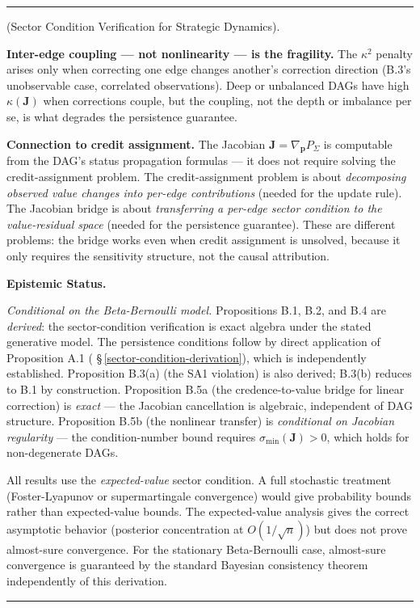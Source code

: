 \documentclass[11pt,oneside]{article}
\newcounter{claim}[section]
\renewcommand{\theclaim}{\thesection.\arabic{claim}}
\newenvironment{segment}[2]{%
  \refstepcounter{claim}%
  \bigskip\noindent\hrule\smallskip
  \noindent{\bfseries #1~\theclaim}\enskip(#2).\par\smallskip
  \noindent\ignorespaces
}{%
  \par\smallskip\noindent\hrule\bigskip
}
\newenvironment{derivation}[1][]{\begin{segment}{Derivation}{#1}}{\end{segment}}
\begin{document}
\begin{derivation}[Sector Condition Verification for Strategic Dynamics]
\textbf{Inter-edge coupling — not nonlinearity — is the fragility.} The $\kappa^2$ penalty arises only when correcting one edge changes another's correction direction (B.3's unobservable case, correlated observations). Deep or unbalanced DAGs have high $\kappa(\mathbf{J})$ when corrections couple, but the coupling, not the depth or imbalance per se, is what degrades the persistence guarantee.

\textbf{Connection to credit assignment.} The Jacobian $\mathbf{J} = \nabla_\mathbf{p} P_\Sigma$ is computable from the DAG's status propagation formulas — it does not require solving the credit-assignment problem. The credit-assignment problem is about \textit{decomposing observed value changes into per-edge contributions} (needed for the update rule). The Jacobian bridge is about \textit{transferring a per-edge sector condition to the value-residual space} (needed for the persistence guarantee). These are different problems: the bridge works even when credit assignment is unsolved, because it only requires the sensitivity structure, not the causal attribution.



\medskip\noindent\textbf{Epistemic Status.}


\textit{Conditional on the Beta-Bernoulli model.} Propositions B.1, B.2, and B.4 are \textit{derived}: the sector-condition verification is exact algebra under the stated generative model. The persistence conditions follow by direct application of Proposition A.1 ( \S\,\ref{sector-condition-derivation}), which is independently established. Proposition B.3(a) (the SA1 violation) is also derived; B.3(b) reduces to B.1 by construction. Proposition B.5a (the credence-to-value bridge for linear correction) is \textit{exact} — the Jacobian cancellation is algebraic, independent of DAG structure. Proposition B.5b (the nonlinear transfer) is \textit{conditional on Jacobian regularity} — the condition-number bound requires $\sigma_{\min}(\mathbf{J}) > 0$, which holds for non-degenerate DAGs.

All results use the \textit{expected-value} sector condition. A full stochastic treatment (Foster-Lyapunov or supermartingale convergence) would give probability bounds rather than expected-value bounds. The expected-value analysis gives the correct asymptotic behavior (posterior concentration at $O(1/\sqrt{n})$) but does not prove almost-sure convergence. For the stationary Beta-Bernoulli case, almost-sure convergence is guaranteed by the standard Bayesian consistency theorem independently of this derivation.


\end{derivation}
\end{document}
